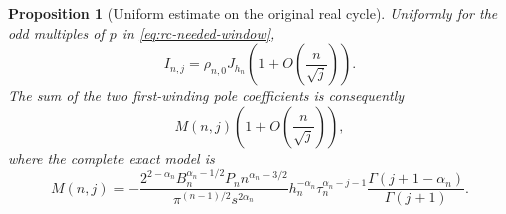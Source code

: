 \documentclass[11pt]{article}
\numberwithin{equation}{section}
\newtheorem{proposition}[theorem]{Proposition}
\theoremstyle{definition}
\begin{document}
\begin{proposition}[Uniform estimate on the original real cycle]
\label{prop:negative-real-cycle-coefficients}
Uniformly for the odd multiples of $p$ in
\eqref{eq:rc-needed-window},
\begin{equation}\label{eq:rc-one-winding-model}
 I_{n,j}=\rho_{n,0}J_{h_n}
           \left(1+O\left(\frac n{\sqrt j}\right)\right).
\end{equation}
The sum of the two first-winding pole coefficients is consequently
\begin{equation}\label{eq:rc-two-winding-model}
 M(n,j)\left(1+O\left(\frac n{\sqrt j}\right)\right),
\end{equation}
where the complete exact model is
\begin{equation}\label{eq:rc-model}
 \boxed{\displaystyle
 M(n,j)=-\frac{2^{2-\alpha_n}B_n^{\alpha_n-1/2}P_n
                    n^{\alpha_n-3/2}}
 {\pi^{(n-1)/2}s^{2\alpha_n}}
 h_n^{-\alpha_n}\tau_n^{\alpha_n-j-1}
 \frac{\Gamma(j+1-\alpha_n)}{\Gamma(j+1)}.}
\end{equation}
\end{proposition}
\end{document}
